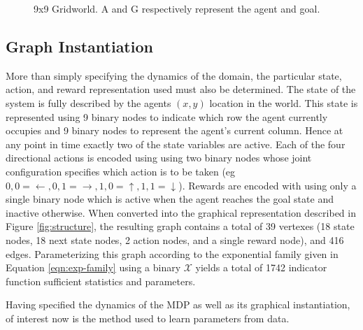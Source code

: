 \documentclass{article} %
\begin{document}
\begin{figure}
\center
{}
\caption{9x9 Gridworld. A and G respectively represent the agent and goal.}
\label{fig:gridworld}
\end{figure}

\subsection{Graph Instantiation}
More than simply specifying the dynamics of the domain, the particular state, action, and reward representation used must also be determined. The state of the system is fully described by the agents $(x,y)$ location in the world. This state is represented using 9 binary nodes to indicate which row the agent currently occupies and 9 binary nodes to represent the agent's current column. Hence at any point in time exactly two of the state variables are active. Each of the four directional actions is encoded using using two binary nodes whose joint configuration specifies which action is to be taken (eg $0,0=\leftarrow, 0,1=\rightarrow, 1,0=\uparrow, 1,1=\downarrow$). Rewards are encoded with using only a single binary node which is active when the agent reaches the goal state and inactive otherwise. When converted into the graphical representation described in Figure \ref{fig:structure}, the resulting graph contains a total of 39 vertexes (18 state nodes, 18 next state nodes, 2 action nodes, and a single reward node), and 416 edges. Parameterizing this graph according to the exponential family given in Equation \ref{eqn:exp-family} using a binary $\mathcal{X}$ yields a total of 1742 indicator function sufficient statistics and parameters.

Having specified the dynamics of the MDP as well as its graphical instantiation, of interest now is the method used to learn parameters from data.
\end{document}
